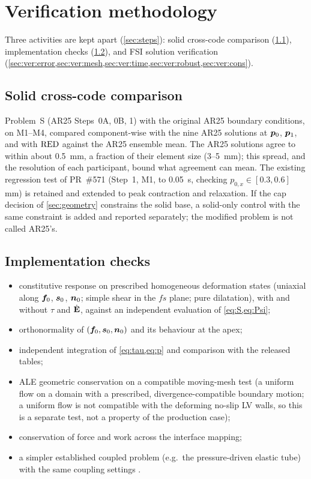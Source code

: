 \section{Verification methodology}\label{sec:verification}

Three activities are kept apart (\cref{sec:steps}): solid cross-code
comparison (\cref{sec:ver:solid}), implementation checks
(\cref{sec:ver:impl}), and FSI solution verification
(\cref{sec:ver:error,sec:ver:mesh,sec:ver:time,sec:ver:robust,sec:ver:cons}).

\subsection{Solid cross-code comparison}\label{sec:ver:solid}
Problem~S (AR25 Steps~0A, 0B, 1) with the original AR25 boundary conditions,
on M1--M4, compared component-wise with the nine AR25 solutions at
$\bm{p}_0$, $\bm{p}_1$, and with $\mathrm{RED}$ against the AR25 ensemble mean. The
AR25 solutions agree to within about \SI{0.5}{mm}, a fraction of their
element size (3--\SI{5}{mm}); this spread, and the resolution of each
participant, bound what agreement can mean. The existing regression test of
PR~\#571 (Step~1, M1, to \SI{0.05}{s}, checking $p_{0,x}\in[0.3,0.6]$\,mm)
is retained and extended to peak contraction and relaxation. If the cap
decision of \cref{sec:geometry} constrains the solid base, a solid-only
control with the same constraint is added and reported separately; the
modified problem is not called AR25's.

\subsection{Implementation checks}\label{sec:ver:impl}
\begin{itemize}
\item constitutive response on prescribed homogeneous deformation states
  (uniaxial along $\bm{f}_0$, $\bm{s}_0$, $\bm{n}_0$; simple shear in the $fs$ plane;
  pure dilatation), with and without $\tau$ and $\dot{\mathbf{E}}$, against an
  independent evaluation of \cref{eq:S,eq:Psi};
\item orthonormality of $(\bm{f}_0,\bm{s}_0,\bm{n}_0)$ and its behaviour at the apex;
\item independent integration of \cref{eq:tau,eq:p} and comparison with the
  released tables;
\item ALE geometric conservation on a compatible moving-mesh test (a
  uniform flow on a domain with a prescribed, divergence-compatible
  boundary motion; a uniform flow is not compatible with the deforming
  no-slip LV walls, so this is a separate test, not a property of the
  production case);
\item conservation of force and work across the interface mapping;
\item a simpler established coupled problem (e.g.\ the pressure-driven
  elastic tube) with the same coupling settings .
\end{itemize}

